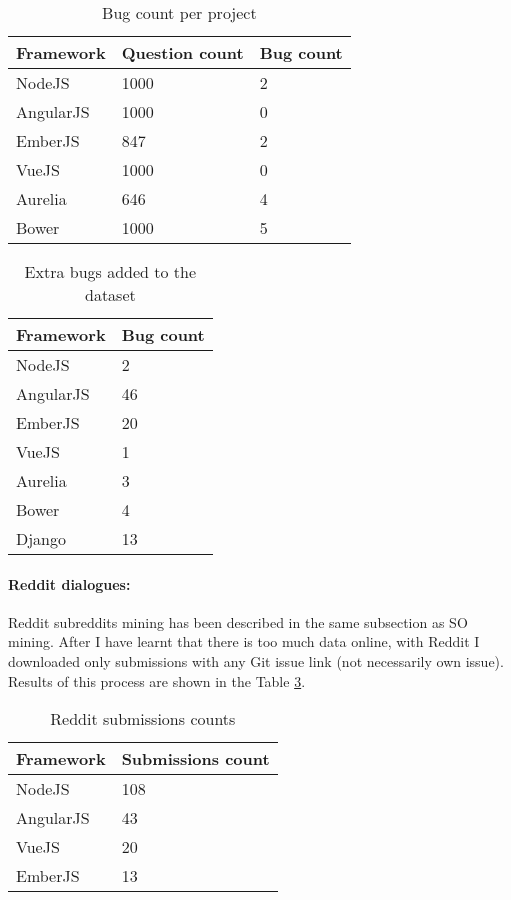 \begin{table}[H]
\centering
\begin{tabular}{ |p{3cm}||p{3cm}||p{3cm}|}
 \hline
\textbf{ Framework }& \textbf{Question count}& \textbf{Bug count}\\
 \hline
 NodeJS & 1000  & 2 \\ \hline
 AngularJS & 1000  &   0 \\ \hline
 EmberJS & 847 & 2 \\ \hline
 VueJS & 1000 & 0 \\ \hline
 Aurelia & 646 & 4 \\ \hline
 Bower & 1000 & 5 \\ \hline
\end{tabular}
\caption{Bug count per project}
\label{table:SObugQuestionsDistribution}
\end{table}

\begin{table}[H]
\centering
\begin{tabular}{ |p{3cm}||p{3cm}|}
 \hline
\textbf{ Framework }& \textbf{Bug count}\\
 \hline
 NodeJS & 2   \\ \hline
 AngularJS & 46 \\ \hline
 EmberJS & 20 \\ \hline
 VueJS & 1 \\ \hline
 Aurelia & 3 \\ \hline
 Bower & 4 \\ \hline
 Django & 13 \\ \hline
\end{tabular}
\caption{Extra bugs added to the dataset}
\label{table:additionalSObugQuestionsDistribution}
\end{table}

\paragraph{Reddit dialogues:}Reddit subreddits mining has been described in the same subsection as SO mining. After I have learnt that there is too much data online, with Reddit I downloaded only submissions with any Git issue link (not necessarily own issue). Results of this process are shown in the Table \ref{table:redditDiscussionsDistribution}.


\begin{table}[H]
\centering
\begin{tabular}{ |p{3cm}||p{3cm}|}
 \hline
\textbf{ Framework }& \textbf{Submissions count}\\
 \hline
 NodeJS   &  108\\ \hline
 AngularJS &   43 \\ \hline
 VueJS & 20\\ \hline
 EmberJS & 13\\ \hline
\end{tabular}
\caption{Reddit submissions counts}
\label{table:redditDiscussionsDistribution}
\end{table}
